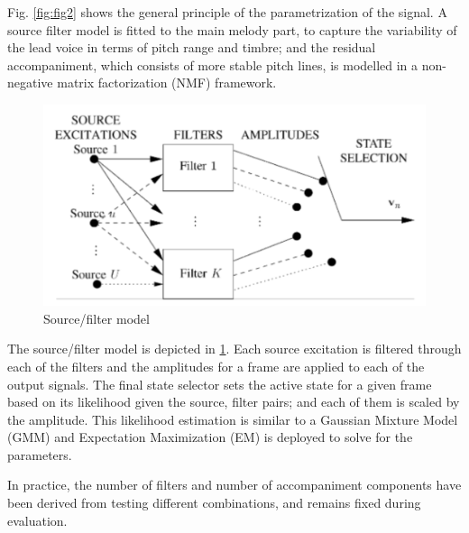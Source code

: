 \documentclass[12pt,journal,compsoc]{IEEEtran}
\begin{document}
Fig. \ref{fig:fig2} shows the general principle of the parametrization of the signal. A source filter model is fitted to the main melody part, to capture the variability of the lead voice in terms of pitch range and timbre; and the residual accompaniment, which consists of more stable pitch lines, is modelled in a non-negative matrix factorization (NMF) framework.

\begin{figure}[H]
\includegraphics[scale=0.2]{images/fig3}
    \caption{Source/filter model}
    \label{fig:fig3}
\end{figure}

The source/filter model is depicted in \ref{fig:fig3}. Each source excitation is filtered through each of the filters and the amplitudes for a frame are applied to each of the output signals. The final state selector sets the active state for a given frame based on its likelihood given the source, filter pairs; and each of them is scaled by the amplitude. This likelihood estimation is similar to a Gaussian Mixture Model (GMM) and Expectation Maximization (EM) is deployed to solve for the parameters.

In practice, the number of filters and number of accompaniment components have been derived from testing different combinations, and remains fixed during evaluation.
\end{document}
